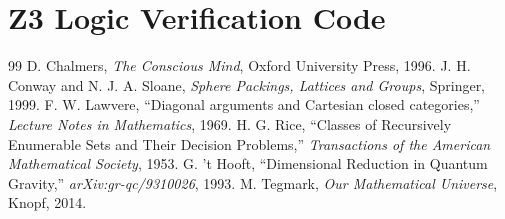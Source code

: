 \documentclass[11pt,onecolumn]{article}
\begin{document}
\section{Z3 Logic Verification Code}

\begin{thebibliography}{99}
 D. Chalmers, \textit{The Conscious Mind}, Oxford University Press, 1996.
 J. H. Conway and N. J. A. Sloane, \textit{Sphere Packings, Lattices and Groups}, Springer, 1999.
 F. W. Lawvere, ``Diagonal arguments and Cartesian closed categories,'' \textit{Lecture Notes in Mathematics}, 1969.
 H. G. Rice, ``Classes of Recursively Enumerable Sets and Their Decision Problems,'' \textit{Transactions of the American Mathematical Society}, 1953.
 G. 't Hooft, ``Dimensional Reduction in Quantum Gravity,'' \textit{arXiv:gr-qc/9310026}, 1993.
 M. Tegmark, \textit{Our Mathematical Universe}, Knopf, 2014.
\end{thebibliography}
\end{document}
